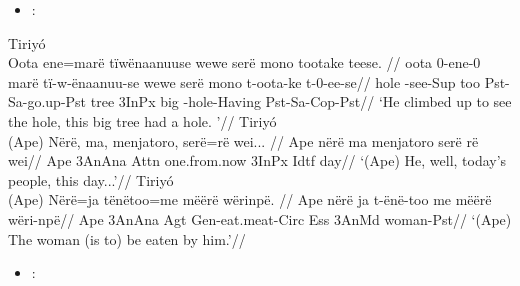 \documentclass[10pt]{article}
\begin{document}
\begin{itemize}
\tightlist
\item
    :
\end{itemize}

\pex\label{}    \a Tiriyó\\
    \label{dados-07-frog-story-marciano-p-091-045}        \begingl
        \glpreamble Oota  ene=marë           tïwënaanuuse            wewe   serë  mono   tootake           teese. //
        \gla oota 0-ene-0 marë tï-w-ënaanuu-se wewe serë mono t-oota-ke t-0-ee-se//
        \glb hole -see-Sup too Pst-Sa-go.up-Pst tree 3InPx big -hole-Having Pst-Sa-Cop-Pst//
            \glft ‘He climbed up to see the hole, this big tree had a hole.  ’//  
        \endgl 
    \a Tiriyó\\
    \label{dados-09-kereramake-p-029-012}        \begingl
        \glpreamble (Ape) Nërë,  ma,  menjatoro,   serë=rë    wei... //
        \gla Ape nërë ma menjatoro serë rë wei//
        \glb Ape 3AnAna Attn one.from.now 3InPx Idtf day//
            \glft ‘(Ape) He, well, today's people, this day...’//  
        \endgl 
    \a Tiriyó\\
    \label{dados-09-kereramake-p-045-324}        \begingl
        \glpreamble (Ape) Nërë=ja    tënëtoo=me               mëërë  wërinpë. //
        \gla Ape nërë ja t-ënë-too me mëërë wëri-npë//
        \glb Ape 3AnAna Agt Gen-eat.meat-Circ Ess 3AnMd woman-Pst//
            \glft ‘(Ape) The woman (is to) be eaten by him.’//  
        \endgl 
\xe

\begin{itemize}
\tightlist
\item
   :
\end{itemize}
\end{document}
